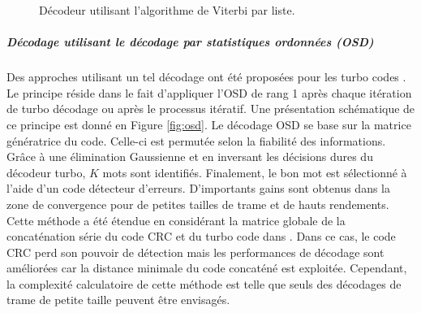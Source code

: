 \begin{figure}[tb]
\begin{center}
{      \label{sub:lva3}}
    \caption{Décodeur utilisant l’algorithme de Viterbi par liste.}
    \label{fig:lva}
  \end{center}
\end{figure}

\subparagraph{Décodage utilisant le décodage par statistiques ordonnées (OSD)} Des approches utilisant un tel décodage 
ont été proposées pour les turbo codes \cite{osdAided}. Le principe réside dans le fait d'appliquer l'OSD \cite{osd} de 
rang 1 après chaque itération de turbo décodage ou après le processus itératif. Une présentation schématique de ce 
principe est donné en Figure \ref{fig:osd}. Le décodage OSD se base sur la matrice génératrice du code. Celle-ci est 
permutée selon la fiabilité des informations. Grâce à une élimination Gaussienne et en inversant les décisions dures du 
décodeur turbo, $K$ mots sont identifiés. Finalement, le bon mot est sélectionné à l'aide d'un code détecteur d'erreurs. 
D'importants gains sont obtenus dans la zone de convergence pour de petites tailles de trame et de hauts rendements.  
Cette méthode a été étendue en considérant la matrice globale de la concaténation série du code CRC et du turbo code dans 
\cite{osdCrcAided}. Dans ce cas, le code CRC perd son pouvoir de détection mais les performances de décodage sont améliorées 
car la distance minimale du code concaténé est exploitée. Cependant, la complexité calculatoire de cette méthode est telle
que seuls des décodages de trame de petite taille peuvent être envisagés.

